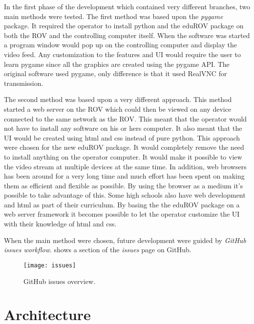 In the first phase of the development which contained very different branches, two main methods were tested. The first method was based upon the \emph{pygame} package. It required the operator to install python and the eduROV package on both the ROV and the controlling computer itself. When the software was started a program window would pop up on the controlling computer and display the video feed. Any customization to the features and UI would require the user to learn pygame since all the graphics are created using the pygame API. The original software used pygame, only difference is that it used RealVNC for transmission.

The second method was based upon a very different approach. This method started a web server on the ROV which could then be viewed on any device connected to the same network as the ROV. This meant that the operator would not have to install any software on his or hers computer. It also meant that the UI would be created using html and css instead of pure python. This approach were chosen for the new eduROV package. It would completely remove the need to install anything on the operator computer. It would make it possible to view the video stream at multiple devices at the same time. In addition, web browsers has been around for a very long time and much effort has been spent on making them as efficient and flexible as possible. By using the browser as a medium it's possible to take advantage of this. Some high schools also have web development and html as part of their curriculum. By basing the the eduROV package on a web server framework it becomes possible to let the operator customize the UI with their knowledge of html and css.

When the main method were chosen, future development were guided by \emph{GitHub issues workflow}.  shows a section of the \emph{issues} page on GitHub.

\begin{figure}[h!]
    \centering
    \texttt{[image: issues]}
    \caption{GitHub issues overview.}
    \label{issues}
\end{figure}

\section{Architecture}

